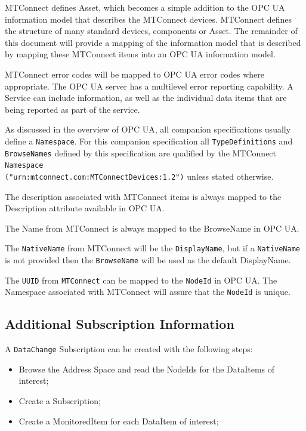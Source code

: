 \documentclass{mtconnect}	%
\begin{document}
MTConnect defines Asset, which becomes a simple addition to the OPC UA information model that describes the MTConnect devices. MTConnect defines the structure of many standard devices, components or Asset. The remainder of this document will provide a mapping of the information model that is described by mapping these MTConnect items into an OPC UA information model.

MTConnect error codes will be mapped to OPC UA error codes where appropriate. The OPC UA server has a multilevel error reporting capability. A Service can include  	 information, as well as the individual data items that are being reported as part of the service.

As discussed in the overview of OPC UA, all companion specifications usually define a \texttt{Namespace}. For this companion specification all \texttt{Type\-Definitions} and \texttt{Browse\-Names} defined by this specification are qualified by the MTConnect \texttt{Namespace} \\
\texttt{("urn:mtconnect.com:MTConnectDevices:1.2")} unless stated otherwise.

The description associated with MTConnect items is always mapped to the Description attribute available in OPC UA.

The Name from MTConnect is always mapped to the BrowseName in OPC UA.

The \texttt{NativeName} from MTConnect will be the \texttt{DisplayName}, but if a \texttt{NativeName} is not provided then the \texttt{BrowseName} will be used as the default DisplayName.

The \texttt{UUID} from \texttt{MTConnect} can be mapped to the \texttt{NodeId} in OPC UA. The Namespace associated with MTConnect will assure that the \texttt{NodeId} is unique.

\FloatBarrier
\subsection{Additional Subscription Information}

A \texttt{DataChange} Subscription can be created with the following steps:

\begin{itemize}
\item Browse the Address Space and read the NodeIds for the DataItems of interest;
\item Create a Subscription;
\item Create a MonitoredItem for each DataItem of interest;
\end{itemize}
\end{document}
